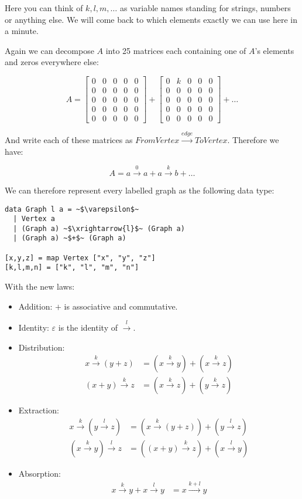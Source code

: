 \documentclass[a4paper,twocolumn]{article}
\begin{document}
Here you can think of $k, l, m, \dots$ as variable names standing for strings, numbers or anything else.
We will come back to which elements exactly we can use here in a minute.

Again we can decompose $A$ into 25 matrices each containing one of $A$'s elements and zeros everywhere else:

\[ A=
\begin{bmatrix}
  0 & 0 & 0 & 0 & 0 \\
  0 & 0 & 0 & 0 & 0 \\
  0 & 0 & 0 & 0 & 0 \\
  0 & 0 & 0 & 0 & 0 \\
  0 & 0 & 0 & 0 & 0
\end{bmatrix}
+ 
\begin{bmatrix}
  0 & k & 0 & 0 & 0 \\
  0 & 0 & 0 & 0 & 0 \\
  0 & 0 & 0 & 0 & 0 \\
  0 & 0 & 0 & 0 & 0 \\
  0 & 0 & 0 & 0 & 0
\end{bmatrix}
+ \dots
\]

And write each of these matrices as $FromVertex\xrightarrow{edge}ToVertex$.
Therefore we have:

\[ A = a\xrightarrow{0}a + a\xrightarrow{k}b + \dots \]

We can therefore represent every labelled graph as the following data type:
\begin{verbatim}
data Graph l a = ~$\varepsilon$~
  | Vertex a
  | (Graph a) ~$\xrightarrow{l}$~ (Graph a)
  | (Graph a) ~$+$~ (Graph a)

[x,y,z] = map Vertex ["x", "y", "z"]
[k,l,m,n] = ["k", "l", "m", "n"]
\end{verbatim}

With the new laws:
\begin{itemize}
\item Addition: $+$ is associative and commutative.
\item Identity: $\varepsilon$ is the identity of $\xrightarrow{l}$.
\item Distribution:
  \begin{align*} 
    x \xrightarrow{k} (y + z) &= (x \xrightarrow{k} y) + (x \xrightarrow{k} z) \\
    (x + y) \xrightarrow{k} z &= (x \xrightarrow{k} z) + (y \xrightarrow{k} z)
  \end{align*}
\item Extraction:
  \begin{align*}
    x \xrightarrow{k} (y \xrightarrow{l} z) &= (x \xrightarrow{k} (y + z)) + (y \xrightarrow{l} z) \\
    (x \xrightarrow{k} y) \xrightarrow{l} z &= ((x + y) \xrightarrow{k} z) + (x \xrightarrow{l} y)
  \end{align*}
\item Absorption:
  \begin{align*}
    x \xrightarrow{k} y + x \xrightarrow{l} y &= x \xrightarrow{k + l} y
  \end{align*}
\end{itemize}
\end{document}
